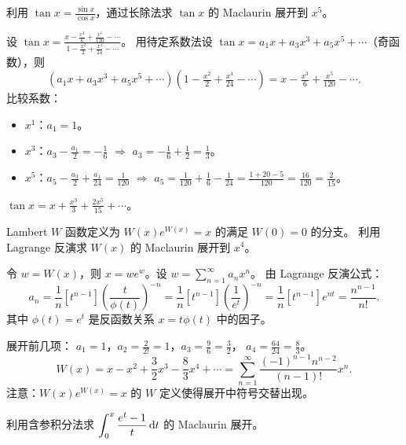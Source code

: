 \documentclass{ctexart}
\begin{document}
\begin{exercise}
  利用 $\tan x = \frac{\sin x}{\cos x}$，通过长除法求 $\tan x$ 的 Maclaurin 展开到 $x^5$。
\end{exercise}

\begin{solution}
  设 $\tan x = \frac{x - \frac{x^3}{6} + \frac{x^5}{120} - \cdots}{1 - \frac{x^2}{2} + \frac{x^4}{24} - \cdots}$。
  用待定系数法设 $\tan x = a_1 x + a_3 x^3 + a_5 x^5 + \cdots$（奇函数），则
  \[
    (a_1 x + a_3 x^3 + a_5 x^5 + \cdots)(1 - \tfrac{x^2}{2} + \tfrac{x^4}{24} - \cdots)
    = x - \tfrac{x^3}{6} + \tfrac{x^5}{120} - \cdots.
  \]
  比较系数：
  \begin{itemize}
    \item $x^1$：$a_1 = 1$。
    \item $x^3$：$a_3 - \frac{a_1}{2} = -\frac{1}{6}$ $\Rightarrow$ $a_3 = -\frac{1}{6} + \frac{1}{2} = \frac{1}{3}$。
    \item $x^5$：$a_5 - \frac{a_3}{2} + \frac{a_1}{24} = \frac{1}{120}$
      $\Rightarrow$ $a_5 = \frac{1}{120} + \frac{1}{6} - \frac{1}{24} = \frac{1+20-5}{120} = \frac{16}{120} = \frac{2}{15}$。
  \end{itemize}
  $\tan x = x + \frac{x^3}{3} + \frac{2x^5}{15} + \cdots$。
\end{solution}

\begin{exercise}[Lagrange 反演——$W$ 函数]
  Lambert $W$ 函数定义为 $W(x)e^{W(x)} = x$ 的满足 $W(0) = 0$ 的分支。
  利用 Lagrange 反演求 $W(x)$ 的 Maclaurin 展开到 $x^4$。
\end{exercise}

\begin{solution}
  令 $w = W(x)$，则 $x = we^w$。设 $w = \sum_{n=1}^\infty a_n x^n$。
  由 Lagrange 反演公式：
  \[
    a_n = \frac{1}{n}[t^{n-1}]\left(\frac{t}{\phi(t)}\right)^{-n}
    = \frac{1}{n}[t^{n-1}]\left(\frac{1}{e^t}\right)^{-n}
    = \frac{1}{n}[t^{n-1}]e^{nt}
    = \frac{n^{n-1}}{n!}.
  \]
  其中 $\phi(t) = e^t$ 是反函数关系 $x = t\phi(t)$ 中的因子。

  展开前几项：
  $a_1 = 1$，$a_2 = \frac{2}{2!} = 1$，$a_3 = \frac{9}{6} = \frac{3}{2}$，
  $a_4 = \frac{64}{24} = \frac{8}{3}$。
  \[
    W(x) = x - x^2 + \frac{3}{2}x^3 - \frac{8}{3}x^4 + \cdots
    = \sum_{n=1}^\infty \frac{(-1)^{n-1}n^{n-2}}{(n-1)!}x^n.
  \]
  注意：$W(x)e^{W(x)} = x$ 的 $W$ 定义使得展开中符号交替出现。
\end{solution}

\begin{exercise}
  利用含参积分法求 $\displaystyle\int_0^x \frac{e^t - 1}{t}\,\mathrm{d} t$ 的 Maclaurin 展开。
\end{exercise}
\end{document}

